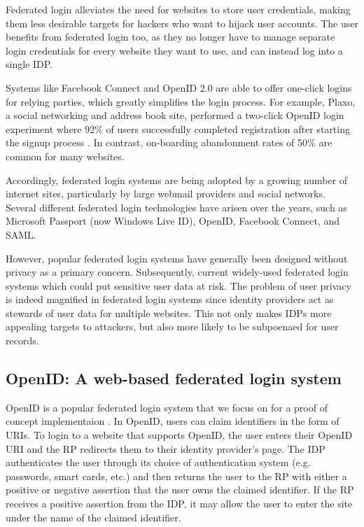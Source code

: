 \documentclass{llncs}
\begin{document}
Federated login alleviates the need for websites to store user
credentials, making them less desirable targets for hackers who want
to hijack user accounts.  The user benefits from federated login too,
as they no longer have to manage separate login credentials for every
website they want to use, and can instead log into a single
IDP.

Systems like Facebook Connect and OpenID 2.0 are able to offer
one-click logins for relying parties, which greatly simplifies the
login process. For example, Plaxo, a social networking and address
book site, performed a two-click OpenID login experiment where 92\% of
users successfully completed registration after starting the signup
process \cite{Ki09}. In contrast, on-boarding abandonment rates of
50\% are common for many websites.

Accordingly, federated login systems are being adopted by a growing
number of internet sites, particularly by large webmail providers and
social networks.  Several different federated login technologies have
arisen over the years, such as Microsoft Passport (now Windows Live
ID), OpenID, Facebook Connect, and SAML.

However, popular federated login systems have generally been designed
without privacy as a primary concern. Subsequently, current
widely-used federated login systems which could put sensitive user
data at risk. The problem of user privacy is indeed magnified in
federated login systems since identity providers act as stewards of
user data for multiple websites. This not only makes IDPs more
appealing targets to attackers, but also more likely to be subpoenaed
for user records.

\subsection{OpenID: A web-based federated login system}

OpenID is a popular federated login system that we focus on for a
proof of concept implementaion \cite{OID}. In OpenID, users can claim
identifiers in the form of URIs. To login to a website that supports
OpenID, the user enters their OpenID URI and the RP redirects them to
their identity provider's page. The IDP authenticates the user through
its choice of authentication system (e.g. passwords, smart cards,
etc.) and then returns the user to the RP with either a positive or
negative assertion that the user owns the claimed identifier. If the
RP receives a positive assertion from the IDP, it may allow the user
to enter the site under the name of the claimed identifier.
\end{document}
